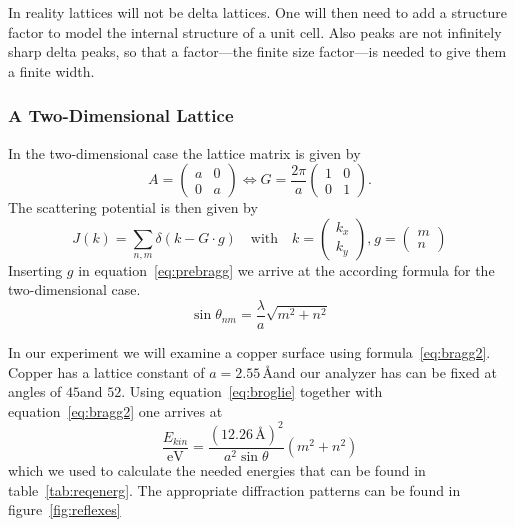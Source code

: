 \documentclass[a4paper,10pt]{scrartcl}
\begin{document}
In reality lattices will not be delta lattices. One will then need to add a structure factor to model the internal structure of a unit cell. Also peaks are not infinitely sharp delta peaks, so that a factor---the finite size factor---is needed to give them a finite width.

\subsubsection{A Two-Dimensional Lattice}

In the two-dimensional case the lattice matrix is given by 
\begin{equation}
A=\left(\begin{array}{cc}
a & 0\\
0 & a
\end{array}\right) \Longleftrightarrow G=\frac{2\pi}{a}\left(\begin{array}{cc}
1 & 0\\
0 & 1
\end{array}\right). 
\end{equation}
The scattering potential is then given by 
\begin{equation}
J(k)=\sum_{n,m}\delta(k-G \cdot g) \quad \mbox{with} \quad k=\left(\begin{array}{cc}
k_{x} \\
k_{y}
\end{array}\right)\mbox{,}~g=\left(\begin{array}{cc}
m \\
n
\end{array}\right)
\end{equation}
Inserting $g$ in equation~\eqref{eq:prebragg} we arrive at the according formula for the two-dimensional case.
\begin{equation}
\sin\theta_{nm}=\frac{\lambda}{a}\sqrt{m^{2}+n^{2}} \label{eq:bragg2}
\end{equation}

In our experiment we will examine a copper surface using formula~\eqref{eq:bragg2}. Copper has a lattice constant of $a=2.55\,$\AA and our analyzer has can be fixed at angles of $45$\textdegree and $52$\textdegree. Using equation~\eqref{eq:broglie} together with equation~\eqref{eq:bragg2} one arrives at
\begin{equation}
\frac{E_{kin}}{\mbox{eV}} = \frac{(12.26\,\mbox{\AA})^{2}}{a^2 \sin\theta}  (m^2 + n^2)
\end{equation}
which we used to calculate the needed energies that can be found in table~\ref{tab:reqenerg}. The appropriate diffraction patterns can be found in figure~\ref{fig:reflexes}
\end{document}
